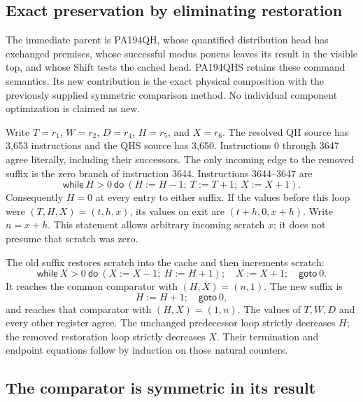 \subsection{Exact preservation by eliminating restoration}
\label{sec:qhs-shift}

The immediate parent is PA194QH, whose quantified distribution head has
exchanged premises, whose successful modus ponens leaves its result in the
visible top, and whose Shift tests the cached head. PA194QHS retains these
command semantics. Its new contribution is the exact physical composition
with the previously supplied symmetric comparison method. No individual
component optimization is claimed as new.

Write $T=r_1$, $W=r_2$, $D=r_4$, $H=r_5$, and $X=r_6$.
The resolved QH source has 3,653 instructions and the QHS source has 3,650.
Instructions 0 through 3647 agree literally, including their successors.
The only incoming edge to the removed suffix is the zero branch of
instruction 3644. Instructions 3644--3647 are
\[
 \mathsf{while}\ H>0\ \mathsf{do}\ (H:=H-1;\ T:=T+1;\ X:=X+1).
\]
Consequently $H=0$ at every entry to either suffix. If the values before
this loop were $(T,H,X)=(t,h,x)$, its values on exit are
$(t+h,0,x+h)$. Write $n=x+h$. This statement allows arbitrary incoming
scratch $x$; it does not presume that scratch was zero.

The old suffix restores scratch into the cache and then increments scratch:
\[
 \mathsf{while}\ X>0\ \mathsf{do}\ (X:=X-1;\ H:=H+1);
 \quad X:=X+1;\quad \mathsf{goto}\ 0.
\]
It reaches the common comparator with $(H,X)=(n,1)$. The new suffix is
\[
 H:=H+1;\quad \mathsf{goto}\ 0,
\]
and reaches that comparator with $(H,X)=(1,n)$. The values of $T,W,D$
and every other register agree. The unchanged predecessor loop strictly
decreases $H$; the removed restoration loop strictly decreases $X$.
Their termination and endpoint equations follow by induction on those
natural counters.

\subsection{The comparator is symmetric in its result}

